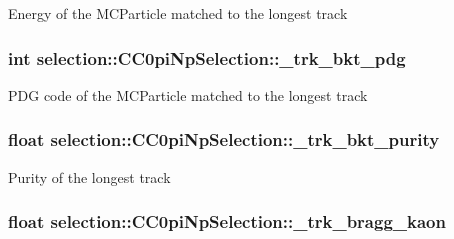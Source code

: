 Energy of the M\-C\-Particle matched to the longest track \hypertarget{classselection_1_1CC0piNpSelection_a7044de37ee4f3615ffe4bb15e9f00f8e}{
\subsubsection[{\-\_\-trk\-\_\-bkt\-\_\-pdg}]{\setlength{\rightskip}{0pt plus 5cm}int selection\-::\-C\-C0pi\-Np\-Selection\-::\-\_\-trk\-\_\-bkt\-\_\-pdg\hspace{0.3cm}{\ttfamily [private]}}}\label{classselection_1_1CC0piNpSelection_a7044de37ee4f3615ffe4bb15e9f00f8e}
P\-D\-G code of the M\-C\-Particle matched to the longest track \hypertarget{classselection_1_1CC0piNpSelection_a39a84b873306f200a2350b4804429791}{
\subsubsection[{\-\_\-trk\-\_\-bkt\-\_\-purity}]{\setlength{\rightskip}{0pt plus 5cm}float selection\-::\-C\-C0pi\-Np\-Selection\-::\-\_\-trk\-\_\-bkt\-\_\-purity\hspace{0.3cm}{\ttfamily [private]}}}\label{classselection_1_1CC0piNpSelection_a39a84b873306f200a2350b4804429791}
Purity of the longest track \hypertarget{classselection_1_1CC0piNpSelection_ac9b23583581239191762cfb60307fb78}{
\subsubsection[{\-\_\-trk\-\_\-bragg\-\_\-kaon}]{\setlength{\rightskip}{0pt plus 5cm}float selection\-::\-C\-C0pi\-Np\-Selection\-::\-\_\-trk\-\_\-bragg\-\_\-kaon\hspace{0.3cm}{\ttfamily [private]}}}\label{classselection_1_1CC0piNpSelection_ac9b23583581239191762cfb60307fb78}

